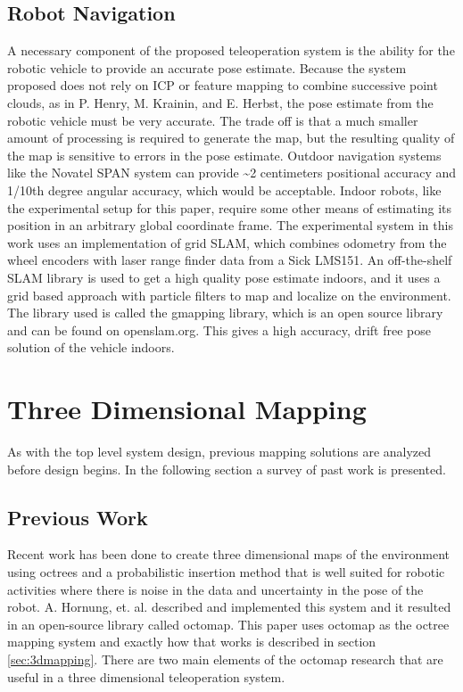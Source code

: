 \documentclass[12pt]{report}
\begin{document}
\section{Robot Navigation}
A necessary component of the proposed teleoperation system is the ability for the robotic vehicle to provide an accurate pose estimate.  Because the system proposed does not rely on ICP or feature mapping to combine successive point clouds, as in P. Henry, M. Krainin, and E. Herbst\cite{Henry2010}, the pose estimate from the robotic vehicle must be very accurate.  The trade off is that a much smaller amount of processing is required to generate the map, but the resulting quality of the map is sensitive to errors in the pose estimate.  Outdoor navigation systems like the Novatel SPAN system can provide \textasciitilde2 centimeters positional accuracy and 1/10th degree angular accuracy\cite{kennedy2006architecture}, which would be acceptable.  Indoor robots, like the experimental setup for this paper, require some other means of estimating its position in an arbitrary global coordinate frame.  The experimental system in this work uses an implementation of grid SLAM, which combines odometry from the wheel encoders with laser range finder data from a Sick LMS151.  An off-the-shelf SLAM library is used to get a high quality pose estimate indoors, and it uses a grid based approach with particle filters to map and localize on the environment.  The library used is called the gmapping library\cite{grisetti2007improved}\cite{grisettiyz2005improving}, which is an open source library and can be found on openslam.org.  This gives a high accuracy, drift free pose solution of the vehicle indoors.


\chapter{Three Dimensional Mapping}\label{chap:3d_mapping}
As with the top level system design, previous mapping solutions are analyzed before design begins.  In the following section a survey of past work is presented.

\section{Previous Work}
\label{sec:previouswork_3dmapping}
Recent work has been done to create three dimensional maps of the environment using octrees and a probabilistic insertion method that is well suited for robotic activities where there is noise in the data and uncertainty in the pose of the robot. A. Hornung, et. al. described and implemented this system and it resulted in an open-source library called octomap.\cite{octomap} This paper uses octomap as the octree mapping system and exactly how that works is described in section \ref{sec:3dmapping}.  There are two main elements of the octomap research that are useful in a three dimensional teleoperation system.
\end{document}
